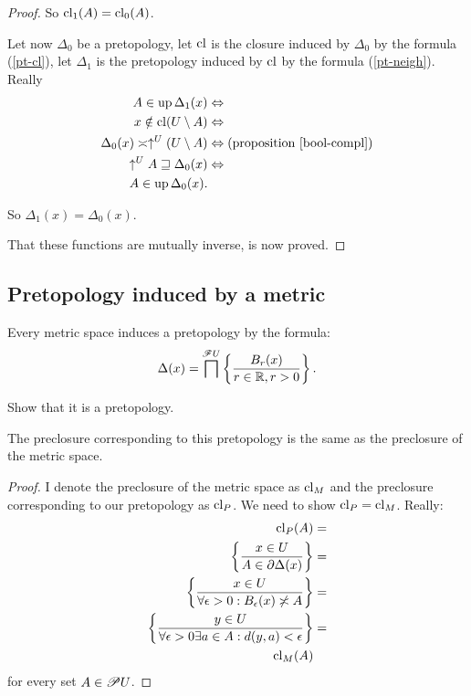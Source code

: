 \begin{proof}
So $\operatorname{cl}_{1}(A)=\operatorname{cl}_{0}(A)$.

Let now $\Delta_{0}$ be a pretopology, let $\operatorname{cl}$ is the closure
induced by $\Delta_{0}$ by the formula (\ref{pt-cl}), let $\Delta_{1}$
is the pretopology induced by $\operatorname{cl}$ by the formula (\ref{pt-neigh}).
Really
\begin{align*}
A\in\up\Delta_{1}(x) & \Leftrightarrow\\
x\notin\cl(U\setminus A) & \Leftrightarrow\\
\Delta_{0}(x)\asymp\uparrow^{U}(U\setminus A) & \Leftrightarrow\text{(proposition \ref{bool-compl})}\\
\uparrow^{U}A\sqsupseteq\Delta_{0}(x) & \Leftrightarrow\\
A\in\up\Delta_{0}(x).
\end{align*}


So $\Delta_{1}(x)=\Delta_{0}(x)$.

That these functions are mutually inverse, is now proved.
\end{proof}

\subsection{Pretopology induced by a metric}

Every metric space induces
a pretopology by the formula:
\[
\Delta(x)=\bigsqcap^{\mathscr{F}U}\left\{ \frac{B_{r}(x)}{r\in\mathbb{R},r>0}\right\}.
\]

\begin{xca}
Show that it is a pretopology.\end{xca}
\begin{prop}
The preclosure corresponding to this pretopology is the same as the
preclosure of the metric space.\end{prop}
\begin{proof}
I denote the preclosure of the metric space as $\operatorname{cl}_{M}$ and the
preclosure corresponding to our pretopology as $\operatorname{cl}_{P}$. We need
to show $\operatorname{cl}_{P}=\operatorname{cl}_{M}$. Really:
\begin{align*}
\operatorname{cl}_{P}(A) & =\\
\left\{ \frac{x\in U}{A\in\partial\Delta(x)}\right\} & =\\
\left\{ \frac{x\in U}{\forall\epsilon>0:B_{\epsilon}(x)\not\asymp A}\right\} & =\\
\left\{ \frac{y\in U}{\forall\epsilon>0\exists a\in A:d(y,a)<\epsilon}\right\} & =\\
\operatorname{cl}_{M}(A)
\end{align*}
for every set $A\in\mathscr{P} U$.
\end{proof}

